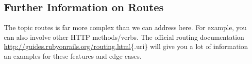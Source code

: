 \documentclass[a4paper]{book}
\begin{document}
\subsection{Further Information on Routes}\label{further-information-on-routes}

The topic routes is far more complex than we can address here. For example, you can also involve other HTTP methods/verbs. The official routing documentation \url{http://guides.rubyonrails.org/routing.html}\{.uri\} will give you a lot of information an examples for these features and edge cases.
\end{document}
